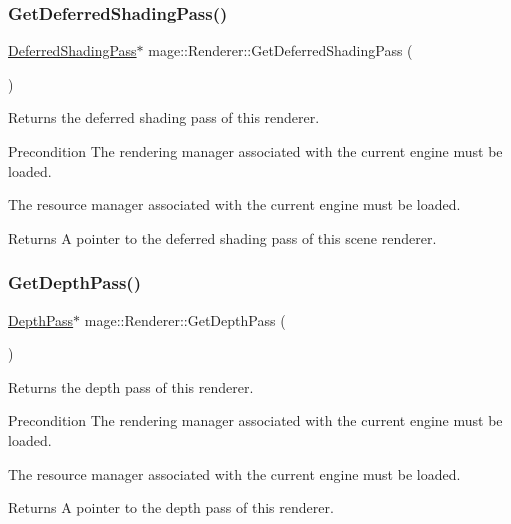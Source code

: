 \subsubsection{\texorpdfstring{Get\+Deferred\+Shading\+Pass()}{GetDeferredShadingPass()}}
{\footnotesize\ttfamily \hyperlink{classmage_1_1_deferred_shading_pass}{Deferred\+Shading\+Pass}$\ast$ mage\+::\+Renderer\+::\+Get\+Deferred\+Shading\+Pass (\begin{DoxyParamCaption}{ }\end{DoxyParamCaption})}

Returns the deferred shading pass of this renderer.

\begin{DoxyPrecond}{Precondition}
The rendering manager associated with the current engine must be loaded. 

The resource manager associated with the current engine must be loaded. 
\end{DoxyPrecond}
\begin{DoxyReturn}{Returns}
A pointer to the deferred shading pass of this scene renderer. 
\end{DoxyReturn}
\hypertarget{classmage_1_1_renderer_ad73ac769e45eeeb9d293b019be996936}{}\label{classmage_1_1_renderer_ad73ac769e45eeeb9d293b019be996936} 
\subsubsection{\texorpdfstring{Get\+Depth\+Pass()}{GetDepthPass()}}
{\footnotesize\ttfamily \hyperlink{classmage_1_1_depth_pass}{Depth\+Pass}$\ast$ mage\+::\+Renderer\+::\+Get\+Depth\+Pass (\begin{DoxyParamCaption}{ }\end{DoxyParamCaption})}

Returns the depth pass of this renderer.

\begin{DoxyPrecond}{Precondition}
The rendering manager associated with the current engine must be loaded. 

The resource manager associated with the current engine must be loaded. 
\end{DoxyPrecond}
\begin{DoxyReturn}{Returns}
A pointer to the depth pass of this renderer. 
\end{DoxyReturn}
\hypertarget{classmage_1_1_renderer_aecc4a5b2b6978ca03796f078c3936423}{}\label{classmage_1_1_renderer_aecc4a5b2b6978ca03796f078c3936423} 
